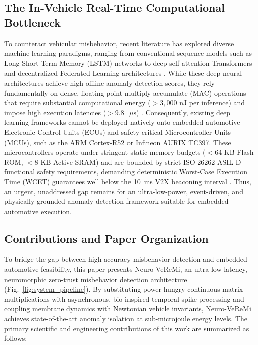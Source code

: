 \documentclass[journal]{IEEEtran}
\begin{document}
\subsection{The In-Vehicle Real-Time Computational Bottleneck}
To counteract vehicular misbehavior, recent literature has explored diverse machine learning paradigms, ranging from conventional sequence models such as Long Short-Term Memory (LSTM) networks to deep self-attention Transformers and decentralized Federated Learning architectures \cite{abdelhakeem2025survey, kalogiannis2026attention, alladi2021deep}. While these deep neural architectures achieve high offline anomaly detection scores, they rely fundamentally on dense, floating-point multiply-accumulate (MAC) operations that require substantial computational energy ($>3{,}000\text{ nJ}$ per inference) and impose high execution latencies ($>9.8\text{ }\mu\text{s}$) \cite{horowitz2014computing}. Consequently, existing deep learning frameworks cannot be deployed natively onto embedded automotive Electronic Control Units (ECUs) and safety-critical Microcontroller Units (MCUs), such as the ARM Cortex-R52 or Infineon AURIX TC397. These microcontrollers operate under stringent static memory budgets ($<64\text{ KB}$ Flash ROM, $<8\text{ KB}$ Active SRAM) and are bounded by strict ISO 26262 ASIL-D functional safety requirements, demanding deterministic Worst-Case Execution Time (WCET) guarantees well below the 10~ms V2X beaconing interval \cite{wilhelm2008worst, iso26262}. Thus, an urgent, unaddressed gap remains for an ultra-low-power, event-driven, and physically grounded anomaly detection framework suitable for embedded automotive execution.

\subsection{Contributions and Paper Organization}
To bridge the gap between high-accuracy misbehavior detection and embedded automotive feasibility, this paper presents Neuro-VeReMi, an ultra-low-latency, neuromorphic zero-trust misbehavior detection architecture (Fig.~\ref{fig:system_pipeline}). By substituting power-hungry continuous matrix multiplications with asynchronous, bio-inspired temporal spike processing and coupling membrane dynamics with Newtonian vehicle invariants, Neuro-VeReMi achieves state-of-the-art anomaly isolation at sub-microjoule energy levels. The primary scientific and engineering contributions of this work are summarized as follows:
\end{document}
